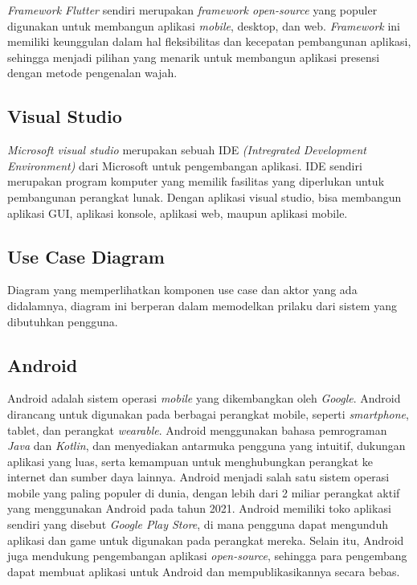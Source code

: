 \emph{Framework Flutter} sendiri merupakan \emph{framework open-source} yang populer digunakan untuk membangun aplikasi \emph{mobile}, desktop, dan web. \emph{Framework} ini memiliki keunggulan dalam hal fleksibilitas dan kecepatan pembangunan aplikasi, sehingga menjadi pilihan yang menarik untuk membangun aplikasi presensi dengan metode pengenalan wajah. \cite{and}

\subsection{Visual Studio}
\emph{Microsoft visual studio} merupakan sebuah IDE \emph{(Intregrated Development Environment)} dari Microsoft untuk pengembangan aplikasi. IDE sendiri merupakan program komputer yang memilik fasilitas yang diperlukan untuk pembangunan perangkat lunak. Dengan aplikasi visual studio, bisa membangun aplikasi GUI, aplikasi konsole, aplikasi web, maupun aplikasi mobile. \cite{k}

\subsection{Use Case Diagram}
Diagram yang memperlihatkan komponen use case dan aktor yang ada didalamnya, diagram ini berperan dalam memodelkan prilaku dari sistem yang dibutuhkan pengguna. \cite{ara}

\subsection{Android}
Android adalah sistem operasi \emph{mobile} yang dikembangkan oleh \emph{Google}. Android dirancang untuk digunakan pada berbagai perangkat mobile, seperti \emph{smartphone}, tablet, dan perangkat \emph{wearable}. Android menggunakan bahasa pemrograman \emph{Java} dan \emph{Kotlin}, dan menyediakan antarmuka pengguna yang intuitif, dukungan aplikasi yang luas, serta kemampuan untuk menghubungkan perangkat ke internet dan sumber daya lainnya.
Android menjadi salah satu sistem operasi mobile yang paling populer di dunia, dengan lebih dari 2 miliar perangkat aktif yang menggunakan Android pada tahun 2021. Android memiliki toko aplikasi sendiri yang disebut \emph{Google Play Store}, di mana pengguna dapat mengunduh aplikasi dan game untuk digunakan pada perangkat mereka. Selain itu, Android juga mendukung pengembangan aplikasi \emph{open-source}, sehingga para pengembang dapat membuat aplikasi untuk Android dan mempublikasikannya secara bebas. \cite{l}

